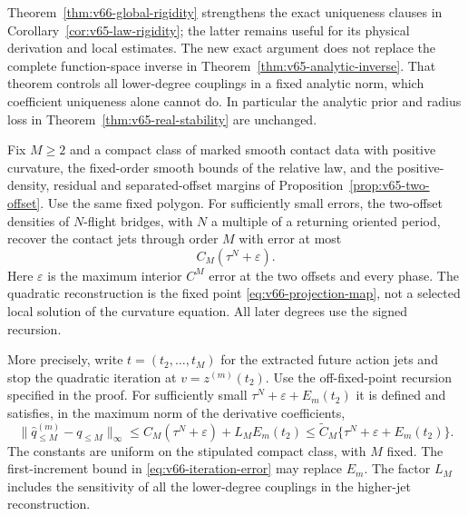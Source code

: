 Theorem~\ref{thm:v66-global-rigidity} strengthens the exact uniqueness
clauses in Corollary~\ref{cor:v65-law-rigidity}; the latter remains
useful for its physical derivation and local estimates.  The new exact
argument does not replace the complete function-space inverse in
Theorem~\ref{thm:v65-analytic-inverse}.  That theorem controls all
lower-degree couplings in a fixed analytic norm, which coefficient
uniqueness alone cannot do.  In particular the analytic prior and radius
loss in Theorem~\ref{thm:v65-real-stability} are unchanged.

\begin{proposition}
\label{prop:v66-finite-flight}
Fix $M\ge2$ and a compact class of marked smooth contact data with
positive curvature, the fixed-order smooth bounds of the relative law,
and the positive-density, residual and separated-offset margins of
Proposition~\ref{prop:v65-two-offset}.  Use the same fixed polygon.
For sufficiently small errors, the two-offset densities of $N$-flight
bridges, with $N$ a multiple of a returning oriented period, recover the
contact jets through order $M$ with error at most
\begin{equation}\label{eq:v66-fixed-order-error}
 C_M(\tau^N+\varepsilon).
\end{equation}
Here $\varepsilon$ is the maximum interior $C^M$ error at the two
offsets and every phase.  The quadratic reconstruction is the fixed
point \eqref{eq:v66-projection-map}, not a selected local solution of
the curvature equation.  All later degrees use the signed recursion.

More precisely, write $t=(t_2,\ldots,t_M)$ for the extracted future
action jets and stop the quadratic iteration at $v=z^{(m)}(t_2)$.
Use the off-fixed-point recursion specified in the proof.  For
sufficiently small $\tau^N+\varepsilon+E_m(t_2)$ it is defined and
satisfies, in the maximum norm of the derivative coefficients,
\begin{equation}\label{eq:v67-complete-stopping-error}
 \|\widehat q_{\le M}^{(m)}-q_{\le M}\|_\infty
 \le C_M(\tau^N+\varepsilon)+L_M E_m(t_2)
 \le\widetilde C_M\{\tau^N+\varepsilon+E_m(t_2)\}.
\end{equation}
The constants are uniform on the stipulated compact class, with $M$
fixed.  The first-increment bound in \eqref{eq:v66-iteration-error}
may replace $E_m$.  The factor $L_M$ includes the sensitivity of
all the lower-degree couplings in the higher-jet reconstruction.
\end{proposition}
